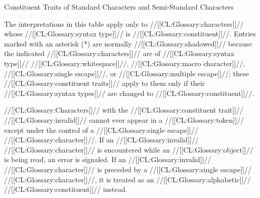 {  \caption{Constituent Traits of Standard Characters and Semi-Standard Characters} \endfig
                    The interpretations in this table apply only to //[[CL:Glossary:characters]]// whose //[[CL:Glossary:syntax type]]// is //[[CL:Glossary:constituent]]//. Entries marked with an asterisk (*) are normally //[[CL:Glossary:shadowed]]//  because the indicated //[[CL:Glossary:characters]]// are of //[[CL:Glossary:syntax type]]// //[[CL:Glossary:whitespace]]//, //[[CL:Glossary:macro character]]//, //[[CL:Glossary:single escape]]//, or //[[CL:Glossary:multiple escape]]//; these //[[CL:Glossary:constituent traits]]// apply to them only if their //[[CL:Glossary:syntax types]]//  are changed to //[[CL:Glossary:constituent]]//.

\endsubsubsection%

\endsubsubsection%
   

//[[CL:Glossary:Characters]]// with the //[[CL:Glossary:constituent trait]]// //[[CL:Glossary:invalid]]//  cannot ever appear in a //[[CL:Glossary:token]]//  except under the control of a //[[CL:Glossary:single escape]]// //[[CL:Glossary:character]]//. If an //[[CL:Glossary:invalid]]// //[[CL:Glossary:character]]// is encountered while an //[[CL:Glossary:object]]// is being read, an error  is signaled. If an //[[CL:Glossary:invalid]]// //[[CL:Glossary:character]]// is preceded by a //[[CL:Glossary:single escape]]// //[[CL:Glossary:character]]//, it is treated as an //[[CL:Glossary:alphabetic]]// //[[CL:Glossary:constituent]]// instead.

}
